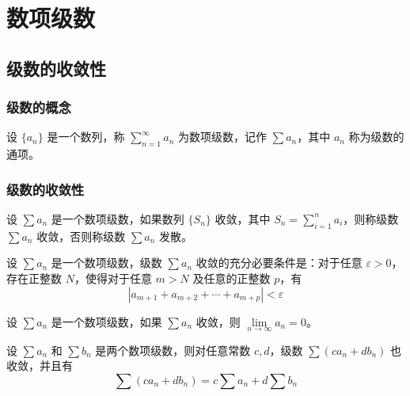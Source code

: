 \chapter{数项级数}

\section{级数的收敛性}

\subsection{级数的概念}

\begin{definition}
    设 $\{a_{n}\}$ 是一个数列，称 $\sum\limits_{n=1}^{\infty} a_{n}$ 为数项级数，记作 $\sum a_{n}$，其中 $a_{n}$ 称为级数的通项。
\end{definition}

\subsection{级数的收敛性}

\begin{definition}
    设 $\sum a_{n}$ 是一个数项级数，如果数列 $\{S_{n}\}$ 收敛，其中 $S_{n} = \sum\limits_{i=1}^{n} a_{i}$，则称级数 $\sum a_{n}$ 收敛，否则称级数 $\sum a_{n}$ 发散。
\end{definition}

\begin{theorem}[级数收敛的柯西准则]
    设 $\sum a_{n}$ 是一个数项级数，级数 $\sum a_{n}$ 收敛的充分必要条件是：对于任意 $\varepsilon > 0$，存在正整数 $N$，使得对于任意 $m > N$ 及任意的正整数 $p$，有
    \begin{equation*}
        \left| a_{m+1} + a_{m+2} + \cdots + a_{m+p} \right| < \varepsilon
    \end{equation*}
\end{theorem}

\begin{theorem}[级数收敛的必要条件]
    设 $\sum a_{n}$ 是一个数项级数，如果 $\sum a_{n}$ 收敛，则 $\lim\limits_{n \to \infty} a_{n} = 0$。
\end{theorem}

\begin{theorem}
    设 $\sum a_{n}$ 和 $\sum b_{n}$ 是两个数项级数，则对任意常数 $c,d$，级数 $\sum (ca_{n} + db_{n})$ 也收敛，并且有
    \begin{equation*}
        \sum (ca_{n} + db_{n}) = c \sum a_{n} + d \sum b_{n}
    \end{equation*}
\end{theorem}

